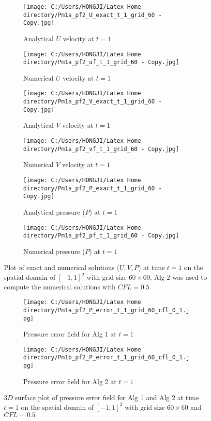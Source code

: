 \begin{figure}[H]
	\centering
	\begin{subfigure}[t]{2.5in}
		\centering
		\texttt{[image: C:/Users/HONGJI/Latex Home directory/Pm1a\_pf2\_U\_exact\_t\_1\_grid\_60 - Copy.jpg]}
		\caption{Analytical $U$ velocity at $t=1$}\label{fig:6.1a}		
	\end{subfigure}
	\quad
	\begin{subfigure}[t]{2.5in}
		\centering
		\texttt{[image: C:/Users/HONGJI/Latex Home directory/Pm1a\_pf2\_uf\_t\_1\_grid\_60 - Copy.jpg]}
		\caption{Numerical $U$ velocity at $t=1$}\label{fig:6.1b}
	\end{subfigure}
	\quad
	\begin{subfigure}[t]{2.5in}
		\centering
		\texttt{[image: C:/Users/HONGJI/Latex Home directory/Pm1a\_pf2\_V\_exact\_t\_1\_grid\_60 - Copy.jpg]}
		\caption{Analytical $V$ velocity at $t=1$}\label{fig:6.1c}
	\end{subfigure}
	\quad
	\begin{subfigure}[t]{2.5in}
		\centering
		\texttt{[image: C:/Users/HONGJI/Latex Home directory/Pm1a\_pf2\_vf\_t\_1\_grid\_60 - Copy.jpg]}
		\caption{Numerical $V$ velocity at $t=1$}\label{fig:6.1d}
	\end{subfigure}
	\quad	
	\begin{subfigure}[t]{2.5in}
		\centering
		\texttt{[image: C:/Users/HONGJI/Latex Home directory/Pm1a\_pf2\_P\_exact\_t\_1\_grid\_60 - Copy.jpg]}
		\caption{Analytical pressure ($P$) at $t=1$}\label{fig:6.1e}
	\end{subfigure}
	\quad	
	\begin{subfigure}[t]{2.5in}
		\centering
		\texttt{[image: C:/Users/HONGJI/Latex Home directory/Pm1a\_pf2\_pf\_t\_1\_grid\_60 - Copy.jpg]}
		\caption{Numerical pressure ($P$) at $t=1$}\label{fig:6.1f}
	\end{subfigure}
	\caption{Plot of exact and numerical solutions ($U,V,P$) at time $t=1$ on the spatial domain of $[-1,1]^2$ with grid size $60 \times 60$, Alg 2 was used to compute the numerical solutions with $CFL=0.5$}\label{fig:6.1}
\end{figure}

\begin{figure}[H]
	\centering
	\begin{subfigure}[t]{2.5in}
		\centering
		\texttt{[image: C:/Users/HONGJI/Latex Home directory/Pm1a\_pf2\_P\_error\_t\_1\_grid\_60\_cfl\_0\_1.jpg]}
		\caption{Pressure error field for Alg 1 at $t=1$ }\label{fig:6.2a}		
	\end{subfigure}
	\quad
	\begin{subfigure}[t]{2.5in}
		\centering
		\texttt{[image: C:/Users/HONGJI/Latex Home directory/Pm1b\_pf2\_P\_error\_t\_1\_grid\_60\_cfl\_0\_1.jpg]}
		\caption{Pressure error field for Alg 2 at $t=1$}\label{fig:6.2b}
	\end{subfigure}
	\caption{$3D$ surface plot of pressure error field for Alg 1 and Alg 2 at time $t=1$ on the spatial domain of $[-1,1]^2$ with grid size $60 \times 60$ and $CFL=0.5$}\label{fig:6.2}
\end{figure}

